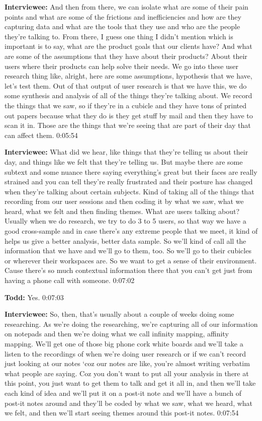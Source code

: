 \textbf{Interviewee:} And then from there, we can isolate what are some of their pain points and what are some of the frictions and inefficiencies and how are they capturing data and what are the tools that they use and who are the people they're talking to.  From there, I guess one thing I didn't mention which is important is to say, what are the product goals that our clients have?  And what are some of the assumptions that they have about their products?  About their users where their products can help solve their needs.  We go into these user research thing like, alright, here are some assumptions, hypothesis that we have, let's test them. Out of that output of user research is that we have this, we do some synthesis and analysis of all of the things they're talking about.  We record the things that we saw, so if they're in a cubicle and they have tons of printed out papers because what they do is they get stuff by mail and then they have to scan it in.  Those are the things that we're seeing that are part of their day that can affect them.   0:05:54

\textbf{Interviewee:} What did we hear, like things that they're telling us about their day, and things like we felt that they're telling us. But maybe there are some subtext and some nuance there saying everything's great but their faces are really strained and you can tell they're really frustrated and their posture has changed when they're talking about certain subjects. Kind of taking all of the things that recording from our user sessions and then coding it by what we saw, what we heard, what we felt and then finding themes. What are users talking about? Usually when we do research, we try to do 3 to 5 users, so that way we have a good cross-sample and in case there's any extreme people that we meet, it kind of helps us give a better analysis, better data sample. So we'll kind of call all the information that we have and we'll go to them, too.  So we'll go to their cubicles or wherever their workspaces are. So we want to get a sense of their environment. Cause there's so much contextual information there that you can't get just from having a phone call with someone.  0:07:02

\textbf{Todd:} Yes.  0:07:03

\textbf{Interviewee:} So, then, that's usually about a couple of weeks doing some researching.  As we're doing the researching, we're capturing all of our information on notepads and then we're doing what we call infinity mapping, affinity mapping.  We'll get one of those big phone cork white boards and we'll take a listen to the recordings of when we're doing user research or if we can't record just looking at our notes ‘coz our notes are like, you're almost writing verbatim what people are saying.  Coz you don't want to put all your analysis in there at this point, you just want to get them to talk and get it all in, and then we'll take each kind of idea and we'll put it on a post-it note and we'll have a bunch of post-it notes around and they'll be coded by what we saw, what we heard, what we felt, and then we'll start seeing themes around this post-it notes.   0:07:54

